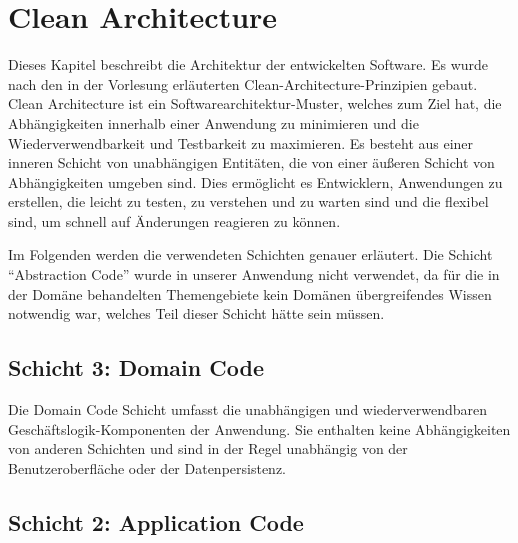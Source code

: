 \chapter{Clean Architecture}

Dieses Kapitel beschreibt die Architektur der entwickelten Software. Es wurde nach den in der Vorlesung erläuterten Clean-Architecture-Prinzipien gebaut. Clean Architecture ist ein Softwarearchitektur-Muster, welches zum Ziel hat, die Abhängigkeiten innerhalb einer Anwendung zu minimieren und die Wiederverwendbarkeit und Testbarkeit zu maximieren. Es besteht aus einer inneren Schicht von unabhängigen Entitäten, die von einer äußeren Schicht von Abhängigkeiten umgeben sind. Dies ermöglicht es Entwicklern, Anwendungen zu erstellen, die leicht zu testen, zu verstehen und zu warten sind und die flexibel sind, um schnell auf Änderungen reagieren zu können.

Im Folgenden werden die verwendeten Schichten genauer erläutert. Die Schicht \enquote{Abstraction Code} wurde in unserer Anwendung nicht verwendet, da für die in der Domäne behandelten Themengebiete kein Domänen übergreifendes Wissen notwendig war, welches Teil dieser Schicht hätte sein müssen. 

\section{Schicht 3: Domain Code}
Die Domain Code Schicht umfasst die unabhängigen und wiederverwendbaren Geschäftslogik-Komponenten der Anwendung. Sie enthalten keine Abhängigkeiten von anderen Schichten und sind in der Regel unabhängig von der Benutzeroberfläche oder der Datenpersistenz.


\section{Schicht 2: Application Code}

